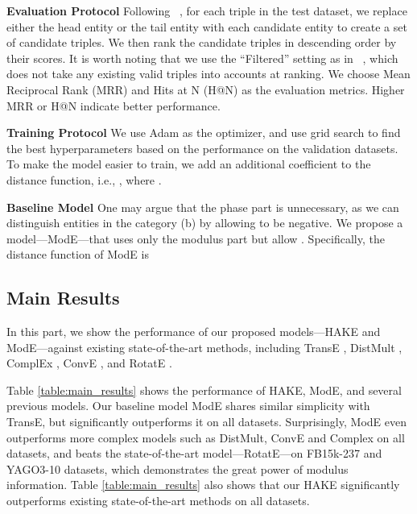 \documentclass[letterpaper]{article} \usepackage{aaai20}  \usepackage{times}  \usepackage{helvet} \usepackage{courier}  \usepackage[hyphens]{url}  \usepackage{graphicx} \urlstyle{rm} \def\UrlFont{\rm}  \usepackage{graphicx}  \frenchspacing  \setlength{\pdfpagewidth}{8.5in}  \setlength{\pdfpageheight}{11in}
\newcommand{\citet}[1]{\citeauthor{#1}~\shortcite{#1}}
\newcommand{\citep}{\cite}
\begin{document}
\noindent\textbf{Evaluation Protocol} Following \citet{transe}, for each triple  in the test dataset, we replace either the head entity  or the tail entity  with each candidate entity to create a set of candidate triples. We then rank the candidate triples in descending order by their scores. It is worth noting that we use the ``Filtered'' setting as in \citet{transe}, which does not take any existing valid triples into accounts at ranking. We choose Mean Reciprocal Rank (MRR) and Hits at N (H@N) as the evaluation metrics. Higher MRR or H@N indicate better performance. 

\noindent\textbf{Training Protocol} We use Adam \citep{adam} as the optimizer, and use grid search to find the best hyperparameters based on the performance on the validation datasets. To make the model easier to train, we add an additional coefficient to the distance function, i.e., , where . 

\noindent\textbf{Baseline Model} One may argue that the phase part is unnecessary, as we can distinguish entities in the category (b) by allowing  to be negative. We propose a model---ModE---that uses only the modulus part but allow . Specifically, the distance function of ModE is


\subsection{Main Results}
In this part, we show the performance of our proposed models---HAKE and ModE---against existing state-of-the-art methods, including TransE \citep{transe}, DistMult \citep{distmult}, ComplEx \citep{complex}, ConvE \citep{conve}, and RotatE \citep{rotate}. 

Table \ref{table:main_results} shows the performance of HAKE, ModE, and several previous models. Our baseline model ModE shares similar simplicity with TransE, but significantly outperforms it on all datasets. Surprisingly, ModE even outperforms more complex models such as DistMult, ConvE and Complex on all datasets, and beats the state-of-the-art model---RotatE---on FB15k-237 and YAGO3-10 datasets, which demonstrates the great power of modulus information. Table \ref{table:main_results} also shows that our HAKE significantly outperforms existing state-of-the-art methods on all datasets. 
\end{document}
